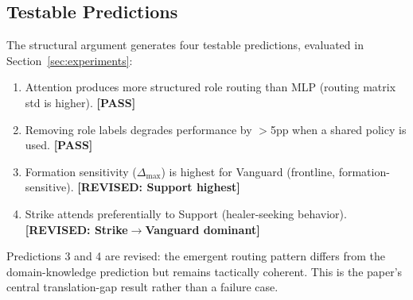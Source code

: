 \subsection{Testable Predictions}

The structural argument generates four testable predictions, evaluated in Section~\ref{sec:experiments}:

\begin{enumerate}
  \item Attention produces more structured role routing than MLP (routing matrix std is higher). \textbf{[PASS]}
  \item Removing role labels degrades performance by $>$5pp when a shared policy is used. \textbf{[PASS]}
  \item Formation sensitivity ($\Delta_{\max}$) is highest for Vanguard (frontline, formation-sensitive). \textbf{[REVISED: Support highest]}
  \item Strike attends preferentially to Support (healer-seeking behavior). \textbf{[REVISED: Strike$\to$Vanguard dominant]}
\end{enumerate}

Predictions 3 and 4 are revised: the emergent routing pattern differs from the domain-knowledge prediction but remains tactically coherent. This is the paper's central translation-gap result rather than a failure case.
